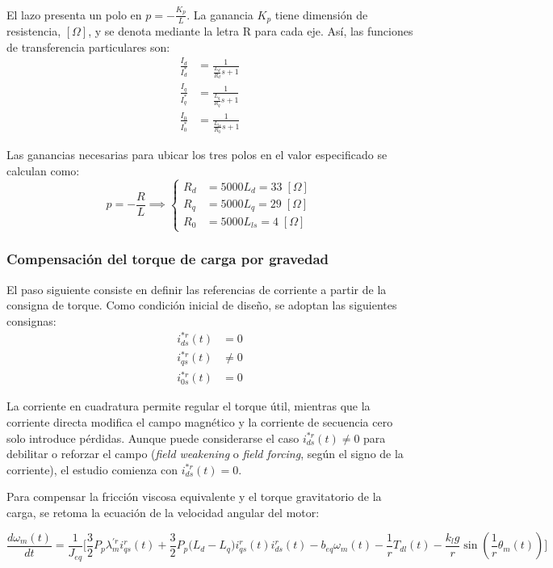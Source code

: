\documentclass[blue,fullpaper]{ludusofficial}  %
\begin{document}
El lazo presenta un polo en $p=-\frac{K_{p}}{L}$. La ganancia $K_p$ tiene dimensión de resistencia, $[\Omega]$, y se denota mediante la letra R para cada eje. Así, las funciones de transferencia particulares son:
\begin{align}
\frac{I_{d}}{I_{d}^{*}} & = \frac{1}{\frac{L_d}{R_{d}}s+1} \\
\frac{I_{q}}{I_{q}^{*}} & = \frac{1}{\frac{L_q}{R_{q}}s+1} \\
\frac{I_{0}}{I_{0}^{*}} & = \frac{1}{\frac{L_{ls}}{R_{0}}s+1}
\end{align}

Las ganancias necesarias para ubicar los tres polos en el valor especificado se calculan como:
\[
p = -\frac{R}{L} \implies \begin{cases}
R_{d} & = 5000 L_{d} = 33\; [\Omega] \\
R_{q} & = 5000 L_{q} = 29\; [\Omega]\\
R_{0} & = 5000 L_{ls} = 4\; [\Omega]
\end{cases}
\]



\subsubsection{Compensación del torque de carga por gravedad}

El paso siguiente consiste en definir las referencias de corriente a partir de la consigna de torque. Como condición inicial de diseño, se adoptan las siguientes consignas:
\begin{align*}
i_{ds}^{*r}(t) & = 0 \\
i_{qs}^{*r}(t) & \neq 0 \\
i_{0s}^{*r}(t) & = 0
\end{align*}

La corriente en cuadratura permite regular el torque útil, mientras que la corriente directa modifica el campo magnético y la corriente de secuencia cero solo introduce pérdidas. Aunque puede considerarse el caso $i_{ds}^{*r}(t) \neq 0$ para debilitar o reforzar el campo (\textit{field weakening} o \textit{field forcing}, según el signo de la corriente), el estudio comienza con $i_{ds}^{*r}(t) = 0$.

Para compensar la fricción viscosa equivalente y el torque gravitatorio de la carga, se retoma la ecuación de la velocidad angular del motor:

\[
\frac{d\omega_{m}(t)}{dt} = \frac{1}{J_{eq}} \Bigg[ \frac{3}{2}P_{p} \lambda_{m}^{'r} i_{qs}^{r}(t) + \frac{3}{2} P_{p} \Big( L_{d} - L_{q} \Big) i_{qs}^{r}(t) i_{ds}^{r}(t) - b_{eq}  \omega_{m}(t)   - \frac{1}{r} T_{dl}(t) - \frac{k_{l}g}{r} \sin \left(  \frac{1}{r} \theta_{m}(t) \right) \Bigg]
\]
\end{document}
